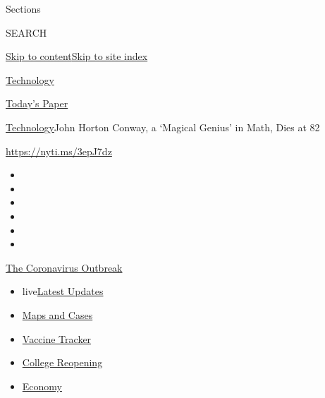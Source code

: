 Sections

SEARCH

\protect\hyperlink{site-content}{Skip to
content}\protect\hyperlink{site-index}{Skip to site index}

\href{https://www.nytimes3xbfgragh.onion/section/technology}{Technology}

\href{https://myaccount.nytimes3xbfgragh.onion/auth/login?response_type=cookie\&client_id=vi}{}

\href{https://www.nytimes3xbfgragh.onion/section/todayspaper}{Today's
Paper}

\href{/section/technology}{Technology}\textbar{}John Horton Conway, a
`Magical Genius' in Math, Dies at 82

\url{https://nyti.ms/3epJ7dz}

\begin{itemize}
\item
\item
\item
\item
\item
\item
\end{itemize}

\href{https://www.nytimes3xbfgragh.onion/news-event/coronavirus?action=click\&pgtype=Article\&state=default\&region=TOP_BANNER\&context=storylines_menu}{The
Coronavirus Outbreak}

\begin{itemize}
\tightlist
\item
  live\href{https://www.nytimes3xbfgragh.onion/2020/08/04/world/coronavirus-covid-19.html?action=click\&pgtype=Article\&state=default\&region=TOP_BANNER\&context=storylines_menu}{Latest
  Updates}
\item
  \href{https://www.nytimes3xbfgragh.onion/interactive/2020/us/coronavirus-us-cases.html?action=click\&pgtype=Article\&state=default\&region=TOP_BANNER\&context=storylines_menu}{Maps
  and Cases}
\item
  \href{https://www.nytimes3xbfgragh.onion/interactive/2020/science/coronavirus-vaccine-tracker.html?action=click\&pgtype=Article\&state=default\&region=TOP_BANNER\&context=storylines_menu}{Vaccine
  Tracker}
\item
  \href{https://www.nytimes3xbfgragh.onion/2020/08/02/us/covid-college-reopening.html?action=click\&pgtype=Article\&state=default\&region=TOP_BANNER\&context=storylines_menu}{College
  Reopening}
\item
  \href{https://www.nytimes3xbfgragh.onion/live/2020/08/03/business/stock-market-today-coronavirus?action=click\&pgtype=Article\&state=default\&region=TOP_BANNER\&context=storylines_menu}{Economy}
\end{itemize}

